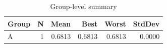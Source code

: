\begin{table}[htbp]
\centering
\caption{Group-level summary}
\label{tab:group-summary}
\begin{tabular}{lrrrrr}
\toprule
\textbf{Group} & \textbf{N} & \textbf{Mean} & \textbf{Best} & \textbf{Worst} & \textbf{StdDev} \\
\midrule
A & 1 & 0.6813 & 0.6813 & 0.6813 & 0.0000 \\
\bottomrule
\end{tabular}
\end{table}